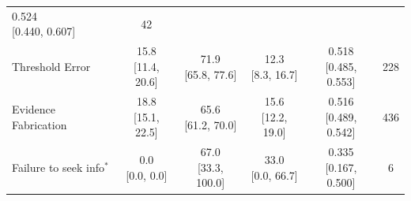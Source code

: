 {\begin{longtable}{l c c c c c}
        \makecell{0.524 \\ \footnotesize{[0.440, 0.607]}} &
        42 \\
    Threshold Error &
        \makecell{15.8 \\ \footnotesize{[11.4, 20.6]}} &
        \makecell{71.9 \\ \footnotesize{[65.8, 77.6]}} &
        \makecell{12.3 \\ \footnotesize{[8.3, 16.7]}} &
        \makecell{0.518 \\ \footnotesize{[0.485, 0.553]}} &
        228 \\
    Evidence Fabrication &
        \makecell{18.8 \\ \footnotesize{[15.1, 22.5]}} &
        \makecell{65.6 \\ \footnotesize{[61.2, 70.0]}} &
        \makecell{15.6 \\ \footnotesize{[12.2, 19.0]}} &
        \makecell{0.516 \\ \footnotesize{[0.489, 0.542]}} &
        436 \\
    Failure to seek info$^{*}$ &
        \makecell{0.0 \\ \footnotesize{[0.0, 0.0]}} &
        \makecell{67.0 \\ \footnotesize{[33.3, 100.0]}} &
        \makecell{33.0 \\ \footnotesize{[0.0, 66.7]}} &
        \makecell{0.335 \\ \footnotesize{[0.167, 0.500]}} &
        6 \\
    \midrule


\end{longtable}}
